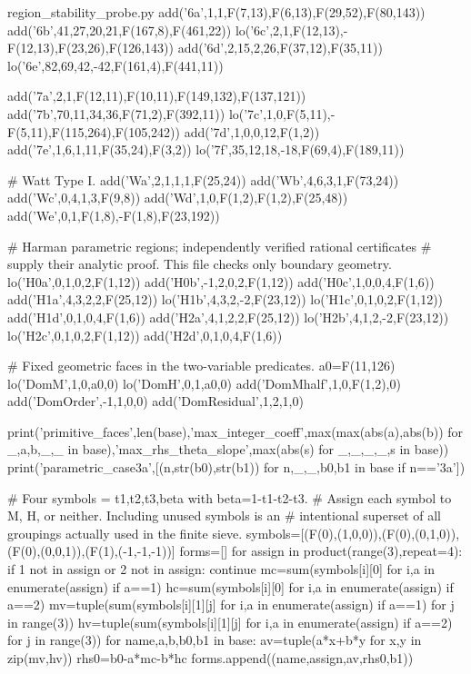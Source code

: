 \begin{filecontents*}[overwrite]{region_stability_probe.py}
add('6a',1,1,F(7,13),F(6,13),F(29,52),F(80,143))
add('6b',41,27,20,21,F(167,8),F(461,22))
lo('6c',2,1,F(12,13),-F(12,13),F(23,26),F(126,143))
add('6d',2,15,2,26,F(37,12),F(35,11))
lo('6e',82,69,42,-42,F(161,4),F(441,11))

add('7a',2,1,F(12,11),F(10,11),F(149,132),F(137,121))
add('7b',70,11,34,36,F(71,2),F(392,11))
lo('7c',1,0,F(5,11),-F(5,11),F(115,264),F(105,242))
add('7d',1,0,0,12,F(1,2))
add('7e',1,6,1,11,F(35,24),F(3,2))
lo('7f',35,12,18,-18,F(69,4),F(189,11))

# Watt Type I.
add('Wa',2,1,1,1,F(25,24))
add('Wb',4,6,3,1,F(73,24))
add('Wc',0,4,1,3,F(9,8))
add('Wd',1,0,F(1,2),F(1,2),F(25,48))
add('We',0,1,F(1,8),-F(1,8),F(23,192))

# Harman parametric regions; independently verified rational certificates
# supply their analytic proof. This file checks only boundary geometry.
lo('H0a',0,1,0,2,F(1,12))
add('H0b',-1,2,0,2,F(1,12))
add('H0c',1,0,0,4,F(1,6))
add('H1a',4,3,2,2,F(25,12))
lo('H1b',4,3,2,-2,F(23,12))
lo('H1c',0,1,0,2,F(1,12))
add('H1d',0,1,0,4,F(1,6))
add('H2a',4,1,2,2,F(25,12))
lo('H2b',4,1,2,-2,F(23,12))
lo('H2c',0,1,0,2,F(1,12))
add('H2d',0,1,0,4,F(1,6))

# Fixed geometric faces in the two-variable predicates.
a0=F(11,126)
lo('DomM',1,0,a0,0)
lo('DomH',0,1,a0,0)
add('DomMhalf',1,0,F(1,2),0)
add('DomOrder',-1,1,0,0)
add('DomResidual',1,2,1,0)

print('primitive_faces',len(base),'max_integer_coeff',max(max(abs(a),abs(b)) for _,a,b,_,_ in base),'max_rhs_theta_slope',max(abs(s) for _,_,_,_,s in base))
print('parametric_case3a',[(n,str(b0),str(b1)) for n,_,_,b0,b1 in base if n=='3a'])

# Four symbols = t1,t2,t3,beta with beta=1-t1-t2-t3.
# Assign each symbol to M, H, or neither. Including unused symbols is an
# intentional superset of all groupings actually used in the finite sieve.
symbols=[(F(0),(1,0,0)),(F(0),(0,1,0)),(F(0),(0,0,1)),(F(1),(-1,-1,-1))]
forms=[]
for assign in product(range(3),repeat=4):
    if 1 not in assign or 2 not in assign: continue
    mc=sum(symbols[i][0] for i,a in enumerate(assign) if a==1)
    hc=sum(symbols[i][0] for i,a in enumerate(assign) if a==2)
    mv=tuple(sum(symbols[i][1][j] for i,a in enumerate(assign) if a==1) for j in range(3))
    hv=tuple(sum(symbols[i][1][j] for i,a in enumerate(assign) if a==2) for j in range(3))
    for name,a,b,b0,b1 in base:
        av=tuple(a*x+b*y for x,y in zip(mv,hv))
        rhs0=b0-a*mc-b*hc
        forms.append((name,assign,av,rhs0,b1))


\end{filecontents*}
